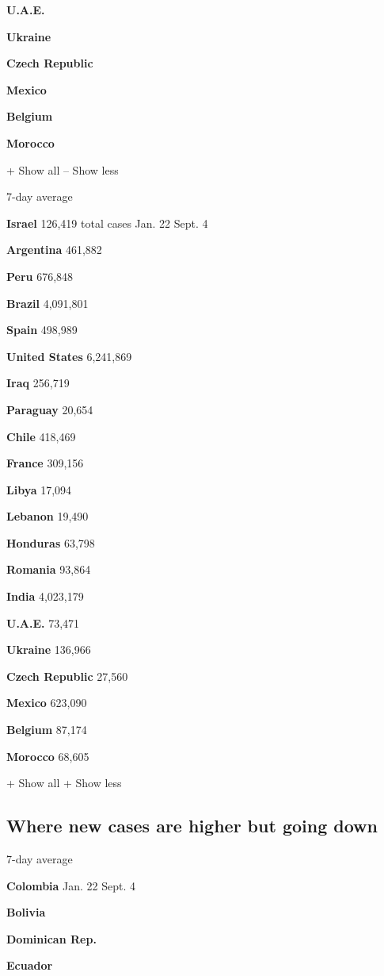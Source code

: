 \textbf{U.A.E.}

\textbf{Ukraine}

\textbf{Czech Republic}

\textbf{Mexico}

\textbf{Belgium}

\textbf{Morocco}

+ Show all -- Show less

7-day average

\textbf{Israel} 126,419 total cases Jan. 22 Sept. 4

\textbf{Argentina} 461,882

\textbf{Peru} 676,848

\textbf{Brazil} 4,091,801

\textbf{Spain} 498,989

\textbf{United States} 6,241,869

\textbf{Iraq} 256,719

\textbf{Paraguay} 20,654

\textbf{Chile} 418,469

\textbf{France} 309,156

\textbf{Libya} 17,094

\textbf{Lebanon} 19,490

\textbf{Honduras} 63,798

\textbf{Romania} 93,864

\textbf{India} 4,023,179

\textbf{U.A.E.} 73,471

\textbf{Ukraine} 136,966

\textbf{Czech Republic} 27,560

\textbf{Mexico} 623,090

\textbf{Belgium} 87,174

\textbf{Morocco} 68,605

+ Show all + Show less

\hypertarget{where-new-cases-are-higher-but-going-down}{%
\subsection{Where new cases are higher but going
down}\label{where-new-cases-are-higher-but-going-down}}

7-day average

\textbf{Colombia} Jan. 22 Sept. 4

\textbf{Bolivia}

\textbf{Dominican Rep.}

\textbf{Ecuador}

